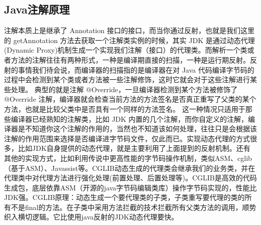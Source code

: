 \documentclass[../../../interview-questions.tex]{subfiles}
\begin{document}
\subsection{Java注解原理}

注解本质上是继承了 Annotation 接口的接口，而当你通过反射，也就是我们这里的 getAnnotation 方法去获取一个注解类实例的时候，其实 JDK 是通过动态代理(Dynamic Proxy)机制生成一个实现我们注解（接口）的代理类。而解析一个类或者方法的注解往往有两种形式，一种是编译期直接的扫描，一种是运行期反射。反射的事情我们待会说，而编译器的扫描指的是编译器在对 Java 代码编译字节码的过程中会检测到某个类或者方法被一些注解修饰，这时它就会对于这些注解进行某些处理。
典型的就是注解 @Override，一旦编译器检测到某个方法被修饰了 @Override 注解，编译器就会检查当前方法的方法签名是否真正重写了父类的某个方法，也就是比较父类中是否具有一个同样的方法签名。
这一种情况只适用于那些编译器已经熟知的注解类，比如 JDK 内置的几个注解，而你自定义的注解，编译器是不知道你这个注解的作用的，当然也不知道该如何处理，往往只是会根据该注解的作用范围来选择是否编译进字节码文件，仅此而已。实现动态代理的方式很多，比如JDK自身提供的动态代理，就是主要利用了上面提到的反射机制。还有其他的实现方式，比如利用传说中更高性能的字节码操作机制，类似ASM、cglib（基于ASM）、Javassist等。CGLIB动态生成的代理类会继承我们的业务类，并在代理类中对代理方法进行强化处理(前置处理、后置处理等)。CGLIB是高效的代码生成包，底层依靠ASM（开源的java字节码编辑类库）操作字节码实现的，性能比JDK强。CGLIB原理：动态生成一个要代理类的子类，子类重写要代理的类的所有不是final的方法。在子类中采用方法拦截的技术拦截所有父类方法的调用，顺势织入横切逻辑。它比使用java反射的JDK动态代理要快。
\end{document}
